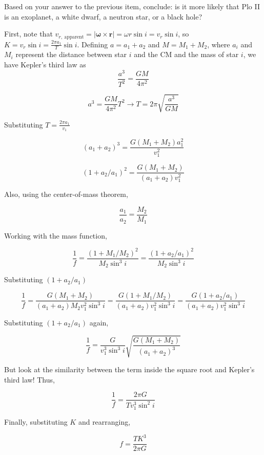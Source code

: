 \documentclass[11pt]{article}
\begin{document}
\begin{pproblem}
\begin{alternativas}
        \item Based on your answer to the previous item, conclude: is it more likely that Plo II is an exoplanet, a white dwarf, a neutron star, or a black hole?
    \end{alternativas}
    \begin{pssolution*}{}{}
        \begin{alternativas}
            \item First, note that \(v_{r,\ \mathrm{apparent}} = |\mathbf{\omega}\times\mathbf{r}| = \omega r \sin i = v_r \sin i\), so \(K = v_r\sin i = \frac{2\pi a_1}{T}\sin i\). Defining \(a=a_1+a_2\) and \(M = M_1+M_2\), where \(a_i\) and \(M_i\) represent the distance between star \(i\) and the CM and the mass of star \(i\), we have Kepler's third law as
            \[\frac{a^3}{T^2} = \frac{GM}{4\pi^2}\]

            \[a^3 = \frac{GM}{4\pi^2}T^2 \rightarrow T = 2\pi \sqrt{\frac{a^3}{GM}}\]

            Substituting $T = \frac{2\pi a_1}{v_1}$

            $$(a_1+a_2)^3= \frac{G(M_1+M_2)a_1^2}{v_1^2}$$

            $$(1+a_2/a_1)^2 = \frac{G(M_1+M_2)}{(a_1+a_2)v_1^2}$$

            Also, using the center-of-mass theorem,

            $$\frac{a_1}{a_2} = \frac{M_2}{M_1}$$

            Working with the mass function,

            $$\frac{1}{f} = \frac{(1+M_1/M_2)^2}{M_2\sin^3 i} = \frac{(1+a_2/a_1)^2}{M_2\sin^3i}$$

            Substituting $(1+a_2/a_1)$

            $$\frac{1}{f} = \frac{G(M_1+M_2)}{(a_1+a_2)M_2v_1^2\sin^3i} = \frac{G(1+M_1/M_2)}{(a_1+a_2)v_1^2\sin^3i} = \frac{G(1+a_2/a_1)}{(a_1+a_2)v_1^2\sin^3i}$$

            Substituting $(1+a_2/a_1)$ again,

            $$\frac{1}{f} = \frac{G}{v_1^3\sin^3i}\sqrt{\frac{G(M_1+M_2)}{(a_1+a_2)^3}}$$

            But look at the similarity between the term inside the square root and Kepler's third law! Thus,

            $$\frac{1}{f} = \frac{2\pi G }{T v_1^3\sin^2i}$$

            Finally, substituting \(K\) and rearranging,

            $$\boxed{f = \frac{TK^3}{2\pi G}}$$


\end{alternativas}
\end{pssolution*}
\end{pproblem}
\end{document}
